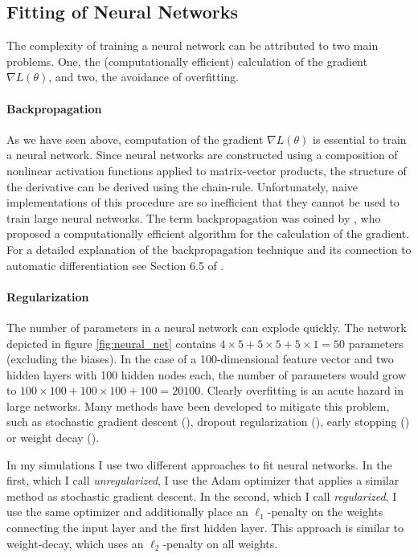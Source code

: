 \subsection{Fitting of Neural Networks}

The complexity of training a neural network can be attributed to two main problems. One,
the (computationally efficient) calculation of the gradient $\nabla L(\theta)$, and two,
the avoidance of overfitting.

\paragraph{Backpropagation}

As we have seen above, computation of the gradient $\nabla L(\theta)$ is essential to
train a neural network. Since neural networks are constructed using a composition of
nonlinear activation functions applied to matrix-vector products, the structure of the
derivative can be derived using the chain-rule. Unfortunately, naive implementations of
this procedure are so inefficient that they cannot be used to train large neural
networks. The term backpropagation was coined by \cite{Rumelhart.1986}, who proposed a
computationally efficient algorithm for the calculation of the gradient. For a detailed
explanation of the backpropagation technique and its connection to automatic
differentiation see Section 6.5 of \cite{Goodfellow.2016}.

\paragraph{Regularization}

The number of parameters in a neural network can explode quickly. The network depicted
in figure \ref{fig:neural_net} contains $4 \times 5 + 5 \times 5 + 5 \times 1 = 50$
parameters (excluding the biases). In the case of a 100-dimensional feature vector and
two hidden layers with 100 hidden nodes each, the number of parameters would grow to
$100 \times 100 + 100 \times 100 + 100 = 20100$. Clearly overfitting is an acute hazard
in large networks. Many methods have been developed to mitigate this problem, such as
stochastic gradient descent (\cite{Ruppert.1985}), dropout regularization
(\cite{Srivastava.2014}), early stopping (\cite{Caruana.2000}) or weight decay
(\cite{Krogh.1991}).

In my simulations I use two different approaches to fit neural networks. In the first,
which I call \emph{unregularized}, I use the Adam optimizer that applies a similar
method as stochastic gradient descent. In the second, which I call \emph{regularized}, I
use the same optimizer and additionally place an $\ell_1$-penalty on the weights
connecting the input layer and the first hidden layer. This approach is similar to
weight-decay, which uses an $\ell_2$-penalty on all weights.
